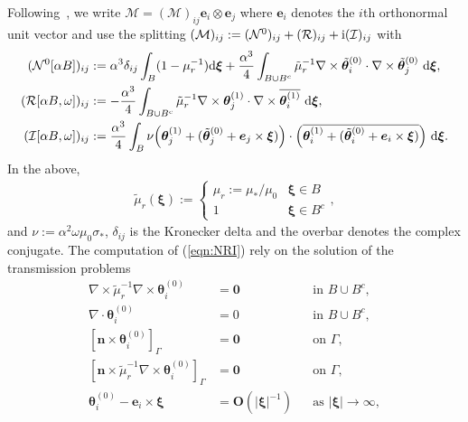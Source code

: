 Following~\cite{LedgerLionheart2019}, we write $\mathcal{M} = ( \mathcal{M})_{ij} \bm{e}_i  \otimes \bm{e}_j$ where $\bm{e}_i$ denotes the $i$th orthonormal unit vector and use the splitting $(\mathcal{M})_{ij}:=(\mathcal{N}^0)_{ij}+(\mathcal{R})_{ij}+\mathrm{i}(  \mathcal{I})_{ij}$ with
\begin{subequations}
\label{eqn:NRI}
\begin{align}
(\mathcal{N}^0[ \alpha B] )_{ij}&:=\alpha^3\delta_{ij}\int_{B}(1-\mu_r^{-1})\dif \bm{\xi}+\frac{\alpha^3}{4}\int_{B\cup B^c}\tilde{\mu}_r^{-1}\nabla\times\tilde{\bm{\theta}}_i^{(0)}\cdot\nabla\times\tilde{\bm{\theta}}_j^{(0)}\ \dif \bm{\xi},\\
(\mathcal{R}[\alpha B, \omega])_{ij}&:=-\frac{\alpha^3}{4}\int_{B\cup B^c}\tilde{\mu}_r^{-1}\nabla\times\bm{\theta}_j^{(1)}\cdot\nabla\times\overline{\bm{\theta}_i^{(1)}}\ \dif \bm{\xi},\\
(\mathcal{I}[\alpha B, \omega])_{ij}&:=\frac{\alpha^3}{4}\int_B\nu\Big(\bm{\theta}_j^{(1)}+(\tilde{\bm{\theta}}_j^{(0)}+\bm{e}_j\times\bm{\xi})\Big)\cdot\Big(\overline{\bm{\theta}_i^{(1)}+(\tilde{\bm{\theta}}_i^{(0)}+\bm{e}_i\times\bm{\xi})}\Big)\ \dif \bm{\xi}.
\end{align}
\end{subequations}
In the above,
\begin{align}
\tilde{\mu}_r ( \bm{\xi} ) := \left \{ \begin{array}{ll}  \mu_r :=\mu_*/\mu_0 & \bm{\xi} \in B\\
1 & \bm{\xi} \in B^c \end{array} \right . \nonumber,
\end{align}
and $\nu:=\alpha^2\omega\mu_0\sigma_*$, $\delta_{ij}$ is the Kronecker delta and the overbar denotes the complex conjugate. The computation of (\ref{eqn:NRI}) rely on the solution of the transmission problems~\cite{LedgerLionheart2019}
\begin{subequations}
\label{eqn:Theta0}
\begin{align}
\nabla\times\tilde{\mu}_r^{-1}\nabla\times\bm{\theta}_i^{(0)}&=\bm{0} &&\textrm{in }B\cup B^c,\\
\nabla\cdot\bm{\theta}_i^{(0)}&=0 &&\textrm{in }B\cup B^c,\\
[{\bm{n}}\times\bm{\theta}_i^{(0)}]_{\Gamma}&=\bm{0} &&\textrm{on }\Gamma,\\
[{\bm{n}}\times\tilde{\mu}_r^{-1}\nabla\times\bm{\theta}_i^{(0)}]_{\Gamma}&=\bm{0} &&\textrm{on }\Gamma,\\
\bm{\theta}_i^{(0)}-{\bm{e}}_i\times\bm{\xi}&=\bm{O}(|\bm{\xi}|^{-1}) &&\textrm{as }|\bm{\xi}|\rightarrow\infty,
\end{align}
\end{subequations}
